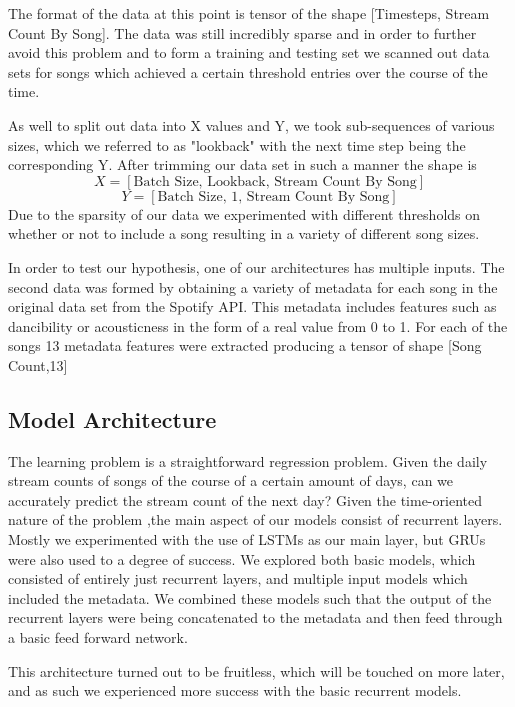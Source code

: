 \documentclass[11pt]{article}
\begin{document}
The format of the data at this point is tensor of the shape [Timesteps, Stream Count By Song]. The data was still incredibly sparse and in order to further avoid this problem and to form a training and testing set we scanned out data sets for songs which achieved a certain threshold entries over the course of the time.

 As well to split out data into X values and Y, we took sub-sequences of various sizes, which we referred to as "lookback" with the next time step being the corresponding Y. After trimming our data set in such a manner the shape is 
\[X = [\text{Batch Size, Lookback, Stream Count By Song}]\]
\[Y = [\text{Batch Size, 1, Stream Count By Song}]\]
Due to the sparsity of our data we experimented with different thresholds on whether or not to include a song resulting in a variety of different song sizes. %

In order to test our hypothesis, one of our architectures has multiple inputs. The second data was formed by obtaining a variety of metadata for each song in the original data set from the Spotify API. This metadata includes features such as dancibility or acousticness in the form of a real value from 0 to 1. For each of the songs 13 metadata features were extracted producing a tensor of shape [Song Count,13] %

\subsection{Model Architecture}

The learning problem is a straightforward regression problem. Given the daily stream counts of songs of the course of a certain amount of days, can we accurately predict the stream count of the next day? Given the time-oriented nature of the problem ,the main aspect of our models consist of recurrent layers. Mostly we experimented with the use of LSTMs as our main layer, but GRUs were also used to a degree of success. We explored both basic models, which consisted of entirely just recurrent layers, and multiple input models which included the metadata. We combined these models such that the output of the recurrent layers were being concatenated to the metadata and then feed through a basic feed forward network. 

This architecture turned out to be fruitless, which will be touched on more later, and as such we experienced more success with the basic recurrent models.
\end{document}
